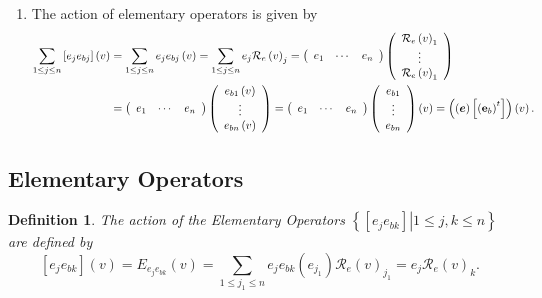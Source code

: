 \documentclass[aps,preprint]{revtex4}%
\newtheorem{definition}[theorem]{Definition}
\begin{document}
\begin{enumerate}
\item The action of elementary operators is given by
\begin{align}
\sum_{1\leq j\leq n}\left[  e_{j}e_{bj}\right]  \left(  v\right)   &
=\sum_{1\leq j\leq n}e_{j}e_{bj}\left(  v\right)  =\sum_{1\leq j\leq n}%
e_{j}\mathcal{R}_{e}\left(  v\right)  _{j}=\left(
\begin{array}
[c]{ccc}%
e_{1} & \cdots & e_{n}%
\end{array}
\right)  \left(
\begin{array}
[c]{c}%
\mathcal{R}_{e}\left(  v\right)  _{1}\\
\vdots\\
\mathcal{R}_{e}\left(  v\right)  _{1}%
\end{array}
\right) \\
&  =\left(
\begin{array}
[c]{ccc}%
e_{1} & \cdots & e_{n}%
\end{array}
\right)  \left(
\begin{array}
[c]{c}%
e_{b1}\left(  v\right) \\
\vdots\\
e_{bn}\left(  v\right)
\end{array}
\right)  =\left(
\begin{array}
[c]{ccc}%
e_{1} & \cdots & e_{n}%
\end{array}
\right)  \left(
\begin{array}
[c]{c}%
e_{b1}\\
\vdots\\
e_{bn}%
\end{array}
\right)  \left(  v\right)  =\left(  \left(  \boldsymbol{e}\right)  \left[
\left(  \mathbf{e}_{b}\right)  ^{t}\right]  \right)  \left(  v\right)  .
\end{align}

\end{enumerate}

\subsection{Elementary Operators}

\begin{definition}
The action of the Elementary Operators $\left\{  \left.  \left[  e_{j}%
e_{bk}\right]  \right\vert 1\leq j,k\leq n\right\}  $ are defined by
\begin{equation}
\left[  e_{j}e_{bk}\right]  \left(  v\right)  =E_{e_{j}e_{bk}}\left(
v\right)  =\sum_{1\leq j_{1}\leq n}e_{j}e_{bk}\left(  e_{j_{1}}\right)
\mathcal{R}_{e}\left(  v\right)  _{j_{1}}=e_{j}\mathcal{R}_{e}\left(
v\right)  _{k}.
\end{equation}

\end{definition}
\end{document}
